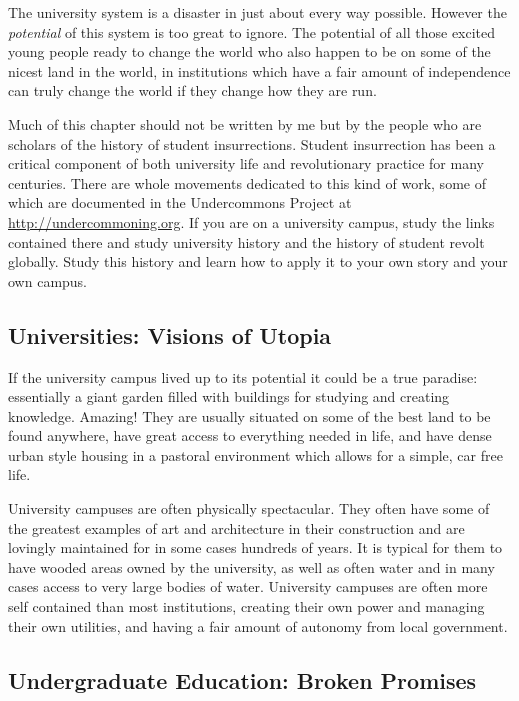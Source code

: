 The university system is a disaster in just about every way possible.
However the \emph{potential} of this system is too great to ignore. The
potential of all those excited young people ready to change the world
who also happen to be on some of the nicest land in the world, in
institutions which have a fair amount of independence can truly change
the world if they change how they are run.

Much of this chapter should not be written by me but by the people who
are scholars of the history of student insurrections. Student
insurrection has been a critical component of both university life and
revolutionary practice for many centuries. There are whole movements
dedicated to this kind of work, some of which are documented in the
Undercommons Project at \url{http://undercommoning.org}. If you are on a
university campus, study the links contained there and study university
history and the history of student revolt globally. Study this history
and learn how to apply it to your own story and your own campus.

\subsection{Universities: Visions of
Utopia}\label{universities-visions-of-utopia}

If the university campus lived up to its potential it could be a true
paradise: essentially a giant garden filled with buildings for studying
and creating knowledge. Amazing! They are usually situated on some of
the best land to be found anywhere, have great access to everything
needed in life, and have dense urban style housing in a pastoral
environment which allows for a simple, car free life.

University campuses are often physically spectacular. They often have
some of the greatest examples of art and architecture in their
construction and are lovingly maintained for in some cases hundreds of
years. It is typical for them to have wooded areas owned by the
university, as well as often water and in many cases access to very
large bodies of water. University campuses are often more self contained
than most institutions, creating their own power and managing their own
utilities, and having a fair amount of autonomy from local government.

\subsection{Undergraduate Education: Broken
Promises}\label{undergraduate-education-broken-promises}

